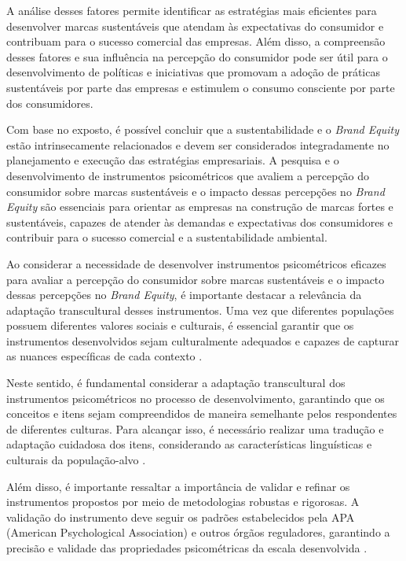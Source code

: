 A análise desses fatores permite identificar as estratégias mais eficientes para desenvolver marcas sustentáveis que atendam às expectativas do consumidor e contribuam para o sucesso comercial das empresas. Além disso, a compreensão desses fatores e sua influência na percepção do consumidor pode ser útil para o desenvolvimento de políticas e iniciativas que promovam a adoção de práticas sustentáveis por parte das empresas e estimulem o consumo consciente por parte dos consumidores.

Com base no exposto, é possível concluir que a sustentabilidade e o \textit{Brand Equity} estão intrinsecamente relacionados e devem ser considerados integradamente no planejamento e execução das estratégias empresariais. A pesquisa e o desenvolvimento de instrumentos psicométricos que avaliem a percepção do consumidor sobre marcas sustentáveis e o impacto dessas percepções no \textit{Brand Equity} são essenciais para orientar as empresas na construção de marcas fortes e sustentáveis, capazes de atender às demandas e expectativas dos consumidores e contribuir para o sucesso comercial e a sustentabilidade ambiental.

Ao considerar a necessidade de desenvolver instrumentos psicométricos eficazes para avaliar a percepção do consumidor sobre marcas sustentáveis e o impacto dessas percepções no \textit{Brand Equity}, é importante destacar a relevância da adaptação transcultural desses instrumentos. Uma vez que diferentes populações possuem diferentes valores sociais e culturais, é essencial garantir que os instrumentos desenvolvidos sejam culturalmente adequados e capazes de capturar as nuances específicas de cada contexto \cite{Zajkowski2019DifferencesProspect}.

Neste sentido, é fundamental considerar a adaptação transcultural dos instrumentos psicométricos no processo de desenvolvimento, garantindo que os conceitos e itens sejam compreendidos de maneira semelhante pelos respondentes de diferentes culturas. Para alcançar isso, é necessário realizar uma tradução e adaptação cuidadosa dos itens, considerando as características linguísticas e culturais da população-alvo \cite{Hustvedt2010EffectsApparel}.

Além disso, é importante ressaltar a importância de validar e refinar os instrumentos propostos por meio de metodologias robustas e rigorosas. A validação do instrumento deve seguir os padrões estabelecidos pela APA (American Psychological Association) e outros órgãos reguladores, garantindo a precisão e validade das propriedades psicométricas da escala desenvolvida \cite{Pandey2014E-lifestylesValidation,Boateng2018BestPrimer}.

